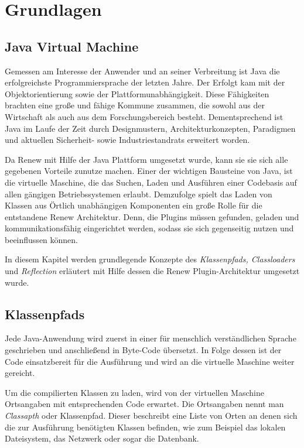 \chapter{Grundlagen} 
\label{cha:Grundlagen}


\section{Java Virtual Machine} \label{sec:JVM}

  Gemessen am Interesse der Anwender und an seiner Verbreitung ist Java die erfolgreichste Programmiersprache der letzten Jahre. Der Erfolgt kam mit der Objektorientierung sowie der Plattformunabhängigkeit. Diese Fähigkeiten brachten eine große und fähige Kommune zusammen, die sowohl aus der Wirtschaft als auch aus dem Forschungsbereich besteht. Dementsprechend ist Java im Laufe der Zeit durch Designmustern, Architekturkonzepten, Paradigmen und aktuellen Sicherheit- sowie Industriestandrats erweitert worden. 

  Da Renew mit Hilfe der Java Plattform umgesetzt wurde, kann sie sie sich alle gegebenen Vorteile zunutze machen. Einer der wichtigen Bausteine von Java, ist die virtuelle Maschine, die das Suchen, Laden und Ausführen einer Codebasis auf allen gängigen Betriebssystemen erlaubt. Demzufolge spielt das Laden von Klassen aus Örtlich unabhängigen Komponenten ein große Rolle für die entstandene Renew Architektur. Denn, die Plugins müssen gefunden, geladen und kommunikationsfähig eingerichtet werden, sodass sie sich gegenseitig nutzen und beeinflussen können.\bigbreak

  In diesem Kapitel werden grundlegende Konzepte des \textit{ Klassenpfads, Classloaders} und \textit{Reflection} erläutert mit Hilfe dessen die Renew Plugin-Architektur umgesetzt wurde.


\section{Klassenpfads} \label{sec:K}

  Jede Java-Anwendung wird zuerst in einer für menschlich verständlichen Sprache geschrieben und anschließend in Byte-Code übersetzt. In Folge dessen ist der Code einsatzbereit für die Ausführung und wird an die virtuelle Maschine weiter gereicht.

  Um die compilierten Klassen zu laden, wird von der virtuellen Maschine Ortsangaben mit entsprechenden Code erwartet. Die Ortsangaben nennt man \textit{Classapth} oder Klassenpfad. Dieser beschreibt eine Liste von Orten an denen sich die zur Ausführung benötigten Klassen befinden, wie zum Beispiel das lokalen Dateisystem, das Netzwerk oder sogar die Datenbank. 

